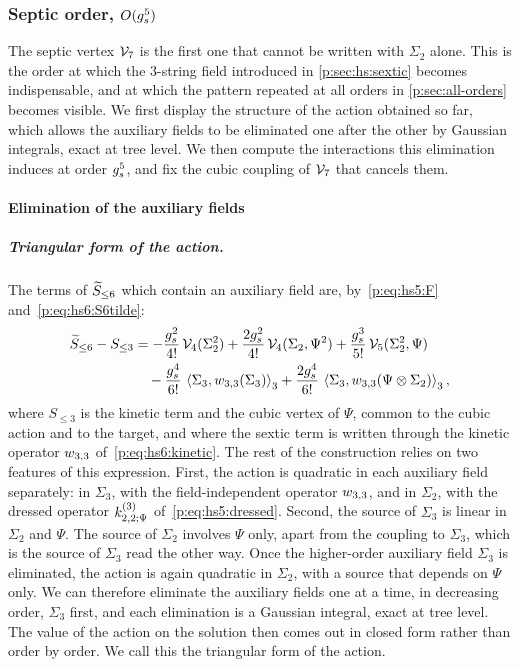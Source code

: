 \subsubsection{Septic order, \texorpdfstring{$O(\gs^5)$}{O(gs**5)}}
\label{p:sec:hs:septic}

The septic vertex $\vertex{7}$ is the first one that cannot be written with $\Sigma_2$ alone.
This is the order at which the $3$-string field introduced in \cref{p:sec:hs:sextic} becomes indispensable, and at which the pattern repeated at all orders in \cref{p:sec:all-orders} becomes visible.
We first display the structure of the action obtained so far, which allows the auxiliary fields to be eliminated one after the other by Gaussian integrals, exact at tree level.
We then compute the interactions this elimination induces at order $\gs^5$, and fix the cubic coupling of $\vertex{7}$ that cancels them.

\paragraph{Elimination of the auxiliary fields}
\label{p:sec:hs:septic:structure}

\subparagraph{Triangular form of the action.}

The terms of $\caction[\le 6]$ which contain an auxiliary field are, by~\eqref{p:eq:hs5:F} and~\eqref{p:eq:hs6:S6tilde}:
\begin{equation}
  \label{p:eq:hs7:action-6}
  \begin{aligned}
    \caction[\le 6] - S_{\le 3}
      &
      = - \frac{\gs^2}{4!} \, \vertex{4}(\Sigma_2^2)
        + \frac{2 \gs^2}{4!} \, \vertex{4}(\Sigma_2, \Psi^2)
        + \frac{\gs^3}{5!} \, \vertex{5}(\Sigma_2^2, \Psi)
      \\ &
      \quad
      - \frac{\gs^4}{6!} \, \pair[3]{\Sigma_3}{\wprod{3}{3}(\Sigma_3)}
        + \frac{2 \gs^4}{6!} \, \pair[3]{\Sigma_3}{\wprod{3}{3}(\Psi \otimes \Sigma_2)},
  \end{aligned}
\end{equation}
where $S_{\le 3}$ is the kinetic term and the cubic vertex of $\Psi$, common to the cubic action and to the target, and where the sextic term is written through the kinetic operator $\wprod{3}{3}$ of~\eqref{p:eq:hs6:kinetic}.
The rest of the construction relies on two features of this expression.
First, the action is quadratic in each auxiliary field separately: in $\Sigma_3$, with the field-independent operator $\wprod{3}{3}$, and in $\Sigma_2$, with the dressed operator $\kin{2}{\Psi}{3}$ of~\eqref{p:eq:hs5:dressed}.
Second, the source of $\Sigma_3$ is linear in $\Sigma_2$ and $\Psi$.
The source of $\Sigma_2$ involves $\Psi$ only, apart from the coupling to $\Sigma_3$, which is the source of $\Sigma_3$ read the other way.
Once the higher-order auxiliary field $\Sigma_3$ is eliminated, the action is again quadratic in $\Sigma_2$, with a source that depends on $\Psi$ only.
We can therefore eliminate the auxiliary fields one at a time, in decreasing order, $\Sigma_3$ first, and each elimination is a Gaussian integral, exact at tree level.
The value of the action on the solution then comes out in closed form rather than order by order.
We call this the triangular form of the action.


